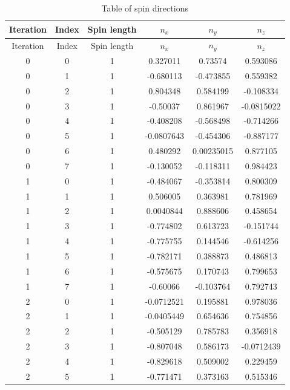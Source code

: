 \documentclass[12pt,a4paper]{article}
\numberwithin{equation}{section}
\numberwithin{figure}{section}
\numberwithin{table}{section}
\begin{document}
	\begin{longtable}{|c|c|c|c|c|c|}
		\caption{Table of spin directions}
		\label{tab:spindirection}\\
		\hline
		Iteration & Index & Spin length & \(n_x\) & \(n_y\) & \(n_z\)\\
		\hline
		\endfirsthead
		
		\hline
		Iteration & Index & Spin length & \(n_x\) & \(n_y\) & \(n_z\)\\
		\hline
		\endhead
		
0 & 0 & 1 & 0.327011 & 0.73574 & 0.593086 \\ \hline
0 & 1 & 1 & -0.680113 & -0.473855 & 0.559382 \\ \hline
0 & 2 & 1 & 0.804348 & 0.584199 & -0.108334 \\ \hline
0 & 3 & 1 & -0.50037 & 0.861967 & -0.0815022 \\ \hline
0 & 4 & 1 & -0.408208 & -0.568498 & -0.714266 \\ \hline
0 & 5 & 1 & -0.0807643 & -0.454306 & -0.887177 \\ \hline
0 & 6 & 1 & 0.480292 & 0.00235015 & 0.877105 \\ \hline
0 & 7 & 1 & -0.130052 & -0.118311 & 0.984423 \\ \hline
1 & 0 & 1 & -0.484067 & -0.353814 & 0.800309 \\ \hline
1 & 1 & 1 & 0.506005 & 0.363981 & 0.781969 \\ \hline
1 & 2 & 1 & 0.0040844 & 0.888606 & 0.458654 \\ \hline
1 & 3 & 1 & -0.774802 & 0.613723 & -0.151744 \\ \hline
1 & 4 & 1 & -0.775755 & 0.144546 & -0.614256 \\ \hline
1 & 5 & 1 & -0.782171 & 0.388873 & 0.486813 \\ \hline
1 & 6 & 1 & -0.575675 & 0.170743 & 0.799653 \\ \hline
1 & 7 & 1 & -0.60066 & -0.103764 & 0.792743 \\ \hline
2 & 0 & 1 & -0.0712521 & 0.195881 & 0.978036 \\ \hline
2 & 1 & 1 & -0.0405449 & 0.654636 & 0.754856 \\ \hline
2 & 2 & 1 & -0.505129 & 0.785783 & 0.356918 \\ \hline
2 & 3 & 1 & -0.807048 & 0.586173 & -0.0712439 \\ \hline
2 & 4 & 1 & -0.829618 & 0.509002 & 0.229459 \\ \hline
2 & 5 & 1 & -0.771471 & 0.373163 & 0.515346 \\ \hline

\end{longtable}
\end{document}
